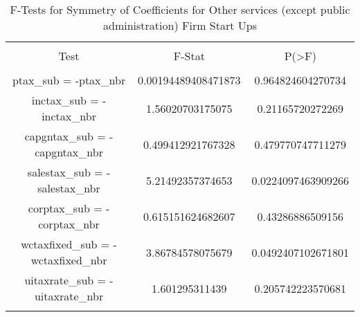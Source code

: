 
\begin{table}[!htbp] \centering 
  \caption{F-Tests for Symmetry of Coefficients for Other services (except public administration) Firm Start Ups} 
  \label{} 
\begin{tabular}{@{\extracolsep{5pt}} ccc} 
\\[-1.8ex]\hline 
\hline \\[-1.8ex] 
Test & F-Stat & P(\textgreater F) \\ 
\hline \\[-1.8ex] 
ptax\_sub = -ptax\_nbr & 0.00194489408471873 & 0.964824604270734 \\ 
inctax\_sub = -inctax\_nbr & 1.56020703175075 & 0.21165720272269 \\ 
capgntax\_sub = -capgntax\_nbr & 0.499412921767328 & 0.479770747711279 \\ 
salestax\_sub = -salestax\_nbr & 5.21492357374653 & 0.0224097463909266 \\ 
corptax\_sub = -corptax\_nbr & 0.615151624682607 & 0.43286886509156 \\ 
wctaxfixed\_sub = -wctaxfixed\_nbr & 3.86784578075679 & 0.0492407102671801 \\ 
uitaxrate\_sub = -uitaxrate\_nbr & 1.601295311439 & 0.205742223570681 \\ 
\hline \\[-1.8ex] 
\end{tabular} 
\end{table} 
